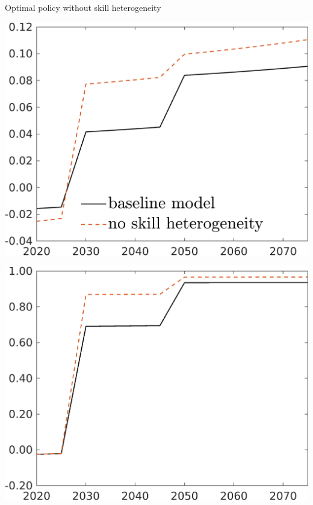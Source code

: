 \documentclass[11pt,aspectratio=169]{beamer}
\begin{document}
\begin{frame}{Optimal policy without skill heterogeneity}
	\hypertarget{heterogeneity}{}
	\centering
	\begin{minipage}[]{0.3\textwidth}
		\includegraphics[width=1\textwidth]{../codding_model/own_basedOnFried/optimalPol_elastS_DisuSci/figures/all_1705/Single_OPT_T_NoTaus_taul_spillover0_skillComp_sep1_BN0_ineq0_red0_etaa0.79_lgd1.png}
	\end{minipage}
	\begin{minipage}[]{0.3\textwidth}
		\includegraphics[width=1\textwidth]{../codding_model/own_basedOnFried/optimalPol_elastS_DisuSci/figures/all_1705/Single_OPT_T_NoTaus_tauf_spillover0_skillComp_sep1_BN0_ineq0_red0_etaa0.79_lgd0.png}

\end{minipage}
\end{frame}
\end{document}
